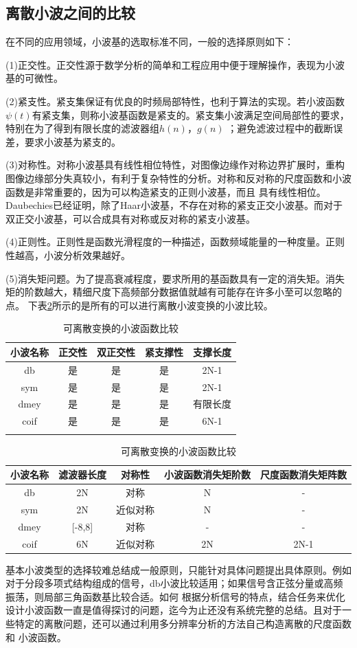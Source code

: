 \subsection{离散小波之间的比较}
在不同的应用领域，小波基的选取标准不同，一般的选择原则如下：
\par(1)正交性。正交性源于数学分析的简单和工程应用中便于理解操作，表现为小波基的可微性。
\par(2)紧支性。紧支集保证有优良的时频局部特性，也利于算法的实现。若小波函数$\psi(t)$有紧支集，则称小波基函数是紧支的。紧支集小波满足空间局部性的要求，特别在为了得到有限长度的滤波器组$h(n)$，$g(n)$
；避免滤波过程中的截断误差，要求小波基为紧支的。
\par(3)对称性。对称小波基具有线性相位特性，对图像边缘作对称边界扩展时，重构图像边缘部分失真较小，有利于复杂特性的分析。对称和反对称的尺度函数和小波函数是非常重要的，因为可以构造紧支的正则小波基，而且
具有线性相位。Daubechies已经证明，除了Haar小波基，不存在对称的紧支正交小波基。而对于双正交小波基，可以合成具有对称或反对称的紧支小波基。
\par(4)正则性。正则性是函数光滑程度的一种描述，函数频域能量的一种度量。正则性越高，小波分析效果越好。
\par(5)消失矩问题。为了提高衰减程度，要求所用的基函数具有一定的消失矩。消失矩的阶数越大，精细尺度下高频部分数据值就越有可能存在许多小至可以忽略的点。
下表\ref{tab:lsxb}所示的是所有的可以进行离散小波变换的小波比较\cite{wxf2003}。
\begin{table}[!h]
	\centering
	\caption{可离散变换的小波函数比较}
	\label{tab:lsxb}
	\begin{tabular}{c|c|c|c|c}
	\hline
	小波名称&正交性&双正交性&紧支撑性&支撑长度\\
	\hline
	db&是&是&是&2N-1\\
	sym&是&是&是&2N-1\\
	dmey&是&是&是&有限长度\\
	coif&是&是&是&6N-1\\
	\hline
	\multicolumn{5}{c}{}
	\end{tabular}
	\begin{tabular}{c|c|c|c|c}
	\hline
	小波名称&滤波器长度&对称性&小波函数消失矩阶数&尺度函数消失矩阵数\\
	\hline
	db&2N&对称&N&-\\
	sym&2N&近似对称&N&-\\
	dmey&[-8,8]&对称&-&-\\
	coif&6N&近似对称&2N&2N-1\\
	\hline
	\end{tabular}
\end{table}
基本小波类型的选择较难总结成一般原则，只能针对具体问题提出具体原则。例如对于分段多项式结构组成的信号，db小波比较适用；如果信号含正弦分量或高频振荡，则局部三角函数基比较合适。如何
根据分析信号的特点，结合任务来优化设计小波函数一直是值得探讨的问题，迄今为止还没有系统完整的总结。且对于一些特定的离散问题，还可以通过利用多分辨率分析的方法自己构造离散的尺度函数和
小波函数。
